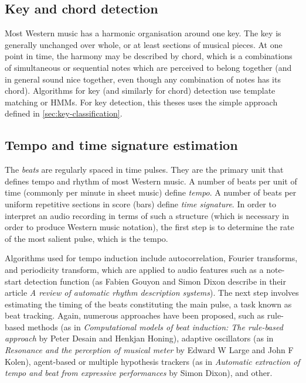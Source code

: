 \subsection{Key and chord detection}\label{subsec:key-and-chord-detection}
Most Western music has a harmonic organisation around one key. The key is generally unchanged over whole, or at least
sections of musical pieces. At one point in time, the harmony may be described by chord, which is a combinations of
simultaneous or sequential notes which are perceived to belong together (and in general sound nice together, even though
any combination of notes has its chord). Algorithms for key (and similarly for chord) detection use template matching or
\acp{HMM}. For key detection, this theses uses the simple approach defined in \cref{sec:key-classification}.

\subsection{Tempo and time signature estimation}\label{subsec:tempo-and-time-signature-estimation}
The \textit{beats} are regularly spaced in time pulses. They are the primary unit that defines tempo and rhythm of most
Western music. A number of beats per unit of time (commonly per minute in sheet music) define \textit{tempo}. A number
of beats per uniform repetitive sections in score (bars) define \textit{time signature}. In order to interpret an audio
recording in terms of such a structure (which is necessary in order to produce Western music notation), the first step
is to determine the rate of the most salient pulse, which is the tempo.

Algorithms used for tempo induction include autocorrelation, Fourier transforms, and periodicity transform, which are
applied to audio features such as a note-start detection function (as Fabien Gouyon and Simon Dixon describe in their
article \textit{A review of automatic rhythm description systems}\cite{gouyon2005review}). The next step involves
estimating the timing of the beats constituting the main pulse, a task known as beat tracking. Again, numerous
approaches have been proposed, such as rule-based methods (as in \textit{Computational models of beat induction:
The rule-based approach}\cite{desain1999computational} by Peter Desain and Henkjan Honing), adaptive oscillators (as
in \textit{Resonance and the perception of musical meter}\cite{large1994resonance} by Edward W Large and John F Kolen),
agent-based or multiple hypothesis trackers (as in \textit{Automatic extraction of tempo and beat from expressive
performances}\cite{dixon2001automatic} by Simon Dixon), and other.

